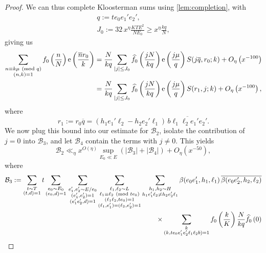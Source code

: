 \documentclass[reqno,11pt]{amsart}
\theoremstyle{definition}
\theoremstyle{remark}
\numberwithin{equation}{section}
\newcommand{\mB}{\mathcal{B}}
\newcommand{\e}{\textnormal{e}}
\renewcommand{\bar}{\overline}
\renewcommand{\hat}{\widehat}
\renewcommand{\pmod}[1]{\ (\textnormal{mod } #1)}
\begin{document}
\begin{proof}
We can thus complete Kloosterman sums using \cref{lem:completion}, with
\begin{gather*} 
    q := te_0e_1'e_2',  \\
    J_0 := 32\, x^\eta \frac{KTE^2}{NE_0} \ge x^\eta \frac{kq}{N},
\end{gather*}
giving us
\[
\begin{aligned}
     \sum_{\substack{n \equiv k\mu \pmod{q} \\ (n, k) = 1}} 
    f_0\left(\frac{n}{N}\right) \e\left(\frac{\bar{n}r_0}{k}\right)
    &=
    \frac{N}{kq} \sum_{|j| \le J_0} \hat{f_0}\left(\frac{jN}{kq}\right) \e\left(\frac{j\mu}{q}\right)
    S(j\bar{q}, r_0; k)
    +  
    O_{\eta}\left(x^{-100}\right)
    \\
    &=
    \frac{N}{kq} \sum_{|j| \le J_0} \hat{f_0}\left(\frac{jN}{kq}\right) \e\left(\frac{j\mu}{q}\right)
    S(r_1, j; k)
    +  
    O_{\eta}\left(x^{-100}\right),
\end{aligned}
\]
where
\[
    r_1 := r_0 \bar{q} = (h_1e_1'\ell_2 - h_2e_2'\ell_1)\, \bar{b \ell_1 \ell_2 e_1' e_2'}.
\]
We now plug this bound into our estimate for $\mB_2$, isolate the contribution of $j = 0$ into $\mB_3$, and let $\mB_4$ contain the terms with $j \neq 0$. This yields 
\begin{equation} \label{eq:b2-estimate}
    \mB_2 \ll_\eta x^{O(\eta)} \sup_{E_0 \ll E} (|\mB_3| + |\mB_4|) + O_\eta(x^{-50}),
\end{equation}
where
\[
\begin{aligned}
    \mB_3 := 
    \sum_{\substack{t \sim T \\ (t, d) = 1}} t \sum_{\substack{e_0 \sim E_0 \\ (e_0, d) = 1}}\, 
    \sum_{\substack{e_1', e_2' \sim E/e_0 \\ (e_1', e_2') = 1 \\ (e_1' e_2', d) = 1}}
    \sum_{\substack{\ell_1, \ell_2 \sim L \\ \ell_1 \equiv \ell_2 \pmod{te_0} \\ (\ell_1 \ell_2, te_0) = 1 \\ (\ell_1, e_1') = (\ell_2, e_2') = 1}}
    \sum_{\substack{h_1, h_2 \sim H \\ h_1e_1'\ell_2 \neq h_2e_2'\ell_1}} \beta(e_0e_1', h_1, \ell_1) \, \bar{\beta(e_0e_2', h_2, \ell_2)} 
    \\
    \qquad\qquad \times 
    \sum_{\substack{k \\ (k, te_0e_1'e_2'\ell_1\ell_2b) = 1}} 
    f_0\left(\frac{k}{K}\right)
    \frac{N}{kq} \hat{f_0}\left(0\right)

\end{aligned}\]
\end{proof}
\end{document}
